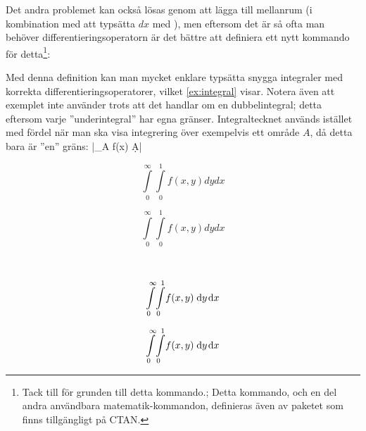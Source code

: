 \documentclass[10pt,../../a4.tex]{subfiles}
\begin{document}
Det andra problemet kan också lösas genom att lägga till mellanrum (i
kombination med att typsätta \(dx\) med ), men eftersom
det är så ofta man behöver differentieringsoperatorn är det bättre att
definiera ett nytt kommando för detta\footnote{Tack till
\textcite{Beaudrap11} för grunden till detta kommando.;%
Detta kommando, och en del andra användbara matematik-kommandon,
definieras även av paketet  som finns tillgängligt
på CTAN.}:
\begin{latexcode}
\makeatletter
\renewcommand\d[1]{\ensuremath{%
\;\mathrm{d}#1\@ifnextchar\d{\!}{}}}
\makeatother
\end{latexcode}
\label{sec:3:integ:kod}

Med denna definition kan man mycket enklare typsätta snygga integraler med
korrekta differentieringsoperatorer, vilket \cref{ex:integral}
visar. Notera även att exemplet inte använder  trots att det
handlar om en dubbelintegral; detta eftersom varje ”underintegral” har
egna gränser. Integraltecknet  används istället med fördel när
man ska visa integrering över exempelvis ett område \(A\), då detta bara
är ”en” gräns:
\latex|\iint_A\! f(x) \d{A}|

\begin{kod}[tbp]
	\centering
			\begin{minipage}[b]{0.225\textwidth}
				\[ \int\limits_0^\infty\int\limits_0^1 f(x,y) dydx \]
			\end{minipage}
			\begin{minipage}{0.625\textwidth}
				\begin{latexcode}
\begin{equation*}
\int\limits_0^\infty
\int\limits_0^1 f(x,y) dydx
\end{equation*}
				\end{latexcode}
			\end{minipage}
	\\
			\begin{minipage}[b]{0.225\textwidth}
				\[ \int\limits_0^\infty\!\int\limits_0^1\! f(x,y) \d{y}\d{x} \]
			\end{minipage}
			\begin{minipage}{0.625\textwidth}
				\begin{latexcode}
\begin{equation*}
\int\limits_0^\infty\!
\int\limits_0^1\! f(x,y) \d{y}\d{x}
\end{equation*}
				\end{latexcode}
			\end{minipage}
	\caption[Integral med korrekt och inkorrekt typsättning]{Integral med
	korrekt (underst) och inkorrekt (överst) typsättning. Notera att 
	 inte finns i \LaTeX{} från början utan måste definieras med 
	den kod som presenteras på .}
	\label{ex:integral}
\end{kod}
\end{document}
